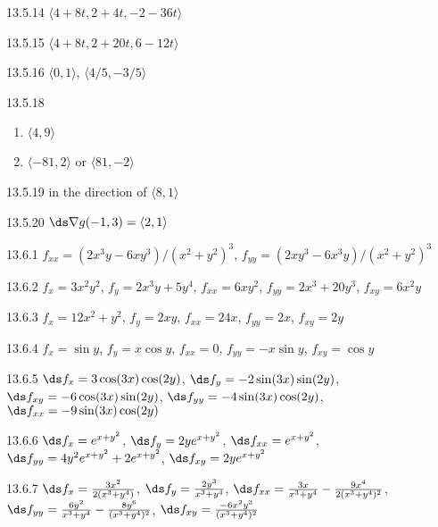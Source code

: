 \begin{Answer}{13.5.14}
$\langle 4+8t,2+4t,-2-36t\rangle$
\end{Answer}
\begin{Answer}{13.5.15}
$\langle 4+8t,2+20t,6-12t\rangle$
\end{Answer}
\begin{Answer}{13.5.16}
$\langle 0,1\rangle$, $\langle 4/5,-3/5\rangle$
\end{Answer}
\begin{Answer}{13.5.18}
\begin{enumerate}
	\item	$\langle 4,9\rangle$
	\item	$\langle -81,2\rangle$ or $\langle 81,-2\rangle$
\end{enumerate}
\end{Answer}
\begin{Answer}{13.5.19}
in the direction of $\langle 8,1\rangle$
\end{Answer}
\begin{Answer}{13.5.20}
$\ds \nabla g(-1,3)=\langle 2,1\rangle$
\end{Answer}
\begin{Answer}{13.6.1}
$f_{xx}=(2x^3y-6xy^3)/(x^2+y^2)^3$,
$f_{yy}=(2xy^3-6x^3y)/(x^2+y^2)^3$
\end{Answer}
\begin{Answer}{13.6.2}
$f_x=3x^2y^2$, $f_y=2x^3y+5y^4$,
$f_{xx}=6xy^2$, $f_{yy}=2x^3+20y^3$, $f_{xy}=6x^2y$
\end{Answer}
\begin{Answer}{13.6.3}
$f_x=12x^2+y^2$, $f_y=2xy$, \hfill\break
$f_{xx}=24x$, $f_{yy}=2x$, $f_{xy}=2y$
\end{Answer}
\begin{Answer}{13.6.4}
$f_x=\sin y$, $f_y=x\cos y$, $f_{xx}=0$, $f_{yy}=-x\sin y$,
$f_{xy}=\cos y$
\end{Answer}
\begin{Answer}{13.6.5}
$\ds f_x=3\cos(3x)\cos(2y)$,\hfill\break
$\ds f_y=-2\sin(3x)\sin(2y)$,\hfill\break
$\ds f_{xy}=-6\cos(3x)\sin(2y)$,\hfill\break
$\ds f_{yy}=-4\sin(3x)\cos(2y)$,\hfill\break
$\ds f_{xx}=-9\sin(3x)\cos(2y)$
\end{Answer}
\begin{Answer}{13.6.6}
$\ds f_x=e^{x+y^2}$, $\ds f_y=2ye^{x+y^2}$,\hfill\break
$\ds f_{xx}=e^{x+y^2}$,\hfill\break
$\ds f_{yy}=4y^2e^{x+y^2}+2e^{x+y^2}$,\hfill\break
$\ds f_{xy}=2ye^{x+y^2}$
\end{Answer}
\begin{Answer}{13.6.7}
$\ds f_x={3x^2\over2(x^3+y^4)}$,
$\ds f_y={2y^3\over x^3+y^4}$,
$\ds f_{xx}={3x\over x^3+y^4}-{9x^4\over 2(x^3+y^4)^2}$,
$\ds f_{yy}={6y^2\over x^3+y^4}-{8y^6\over (x^3+y^4)^2}$,\hfill\break
$\ds f_{xy}={-6x^2y^3\over (x^3+y^4)^2}$
\end{Answer}
